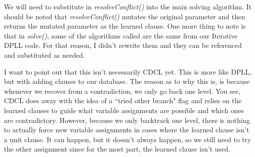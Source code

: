 We will need to substitute in \textit{resolveConflict()} into the main solving algorithm. 
It should be noted that \textit{resolveConflict()} mutates the original parameter and then 
returns the mutated parameter as the learned clause. One more thing to note is that in
\textit{solve()}, some of the algorithms called are the same from our Iterative DPLL code. 
For that reason, I didn't rewrite them and they can be referenced and substituted as needed.

I want to point out that this isn't necessarily CDCL yet. This is more like DPLL, but with 
adding clauses to our database. The reason as to why this is, is because whenever we recover 
from a contradiction, we only go back one level. You see, CDCL does away with the idea of a
``tried other branch" flag and relies on the learned clauses to guide what variable assignments
are possible and which ones are contradictory. However, because we only backtrack one level, there 
is nothing to actually force new variable assignments in cases where the learned clause isn't a unit 
clause. It can happen, but it doesn't always happen, so we still need to try the other assignment 
since for the most part, the learned clause isn't used.